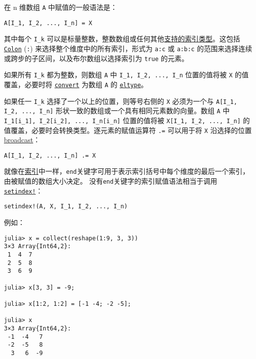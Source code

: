 在 n 维数组 \texttt{A} 中赋值的一般语法是：




\begin{lstlisting}
A[I_1, I_2, ..., I_n] = X
\end{lstlisting}



其中每个 \texttt{I\_k} 可以是标量整数，整数数组或任何其他\hyperlink{3335763678693018755}{支持的索引类型}。这包括 \hyperlink{13649361117037263099}{\texttt{Colon}} (\texttt{:}) 来选择整个维度中的所有索引，形式为 \texttt{a:c} 或 \texttt{a:b:c} 的范围来选择连续或跨步的子区间，以及布尔数组以选择索引为 \texttt{true} 的元素。



如果所有 \texttt{I\_k} 都为整数，则数组 \texttt{A} 中 \texttt{I\_1, I\_2, ..., I\_n} 位置的值将被 \texttt{X} 的值覆盖，必要时将 \hyperlink{1846942650946171605}{\texttt{convert}} 为数组 \texttt{A} 的 \hyperlink{6396209842929672718}{\texttt{eltype}}。



如果任一 \texttt{I\_k} 选择了一个以上的位置，则等号右侧的 \texttt{X} 必须为一个与 \texttt{A[I\_1, I\_2, ..., I\_n]} 形状一致的数组或一个具有相同元素数的向量。数组 \texttt{A} 中 \texttt{I\_1[i\_1], I\_2[i\_2], ..., I\_n[i\_n]} 位置的值将被 \texttt{X[I\_1, I\_2, ..., I\_n]} 的值覆盖，必要时会转换类型。逐元素的赋值运算符 \texttt{.=} 可以用于将 \texttt{X} 沿选择的位置 \hyperlink{10888979137852348176}{broadcast}：




\begin{lstlisting}
A[I_1, I_2, ..., I_n] .= X
\end{lstlisting}



就像在\hyperlink{16717190941363337071}{索引}中一样，\texttt{end}关键字可用于表示索引括号中每个维度的最后一个索引，由被赋值的数组大小决定。 没有\texttt{end}关键字的索引赋值语法相当于调用\hyperlink{1309244355901386657}{\texttt{setindex!}}：




\begin{lstlisting}
setindex!(A, X, I_1, I_2, ..., I_n)
\end{lstlisting}



例如：




\begin{verbatim}
julia> x = collect(reshape(1:9, 3, 3))
3×3 Array{Int64,2}:
 1  4  7
 2  5  8
 3  6  9

julia> x[3, 3] = -9;

julia> x[1:2, 1:2] = [-1 -4; -2 -5];

julia> x
3×3 Array{Int64,2}:
 -1  -4   7
 -2  -5   8
  3   6  -9
\end{verbatim}




